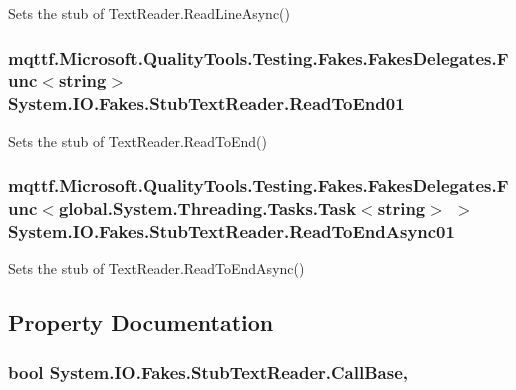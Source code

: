 Sets the stub of Text\-Reader.\-Read\-Line\-Async()

\hypertarget{class_system_1_1_i_o_1_1_fakes_1_1_stub_text_reader_a0ea9412e4d05f6a7040d26d37a579081}{
\subsubsection[{Read\-To\-End01}]{\setlength{\rightskip}{0pt plus 5cm}mqttf.\-Microsoft.\-Quality\-Tools.\-Testing.\-Fakes.\-Fakes\-Delegates.\-Func$<$string$>$ System.\-I\-O.\-Fakes.\-Stub\-Text\-Reader.\-Read\-To\-End01}}\label{class_system_1_1_i_o_1_1_fakes_1_1_stub_text_reader_a0ea9412e4d05f6a7040d26d37a579081}


Sets the stub of Text\-Reader.\-Read\-To\-End()

\hypertarget{class_system_1_1_i_o_1_1_fakes_1_1_stub_text_reader_aed9a2fa61a0d96dbf0d1226993abd549}{
\subsubsection[{Read\-To\-End\-Async01}]{\setlength{\rightskip}{0pt plus 5cm}mqttf.\-Microsoft.\-Quality\-Tools.\-Testing.\-Fakes.\-Fakes\-Delegates.\-Func$<$global.\-System.\-Threading.\-Tasks.\-Task$<$string$>$ $>$ System.\-I\-O.\-Fakes.\-Stub\-Text\-Reader.\-Read\-To\-End\-Async01}}\label{class_system_1_1_i_o_1_1_fakes_1_1_stub_text_reader_aed9a2fa61a0d96dbf0d1226993abd549}


Sets the stub of Text\-Reader.\-Read\-To\-End\-Async()



\subsection{Property Documentation}
\hypertarget{class_system_1_1_i_o_1_1_fakes_1_1_stub_text_reader_accfcfea0f1e98e564d13404ef21d50f0}{
\subsubsection[{Call\-Base}]{\setlength{\rightskip}{0pt plus 5cm}bool System.\-I\-O.\-Fakes.\-Stub\-Text\-Reader.\-Call\-Base\hspace{0.3cm}{\ttfamily [get]}, {\ttfamily [set]}}}\label{class_system_1_1_i_o_1_1_fakes_1_1_stub_text_reader_accfcfea0f1e98e564d13404ef21d50f0}


